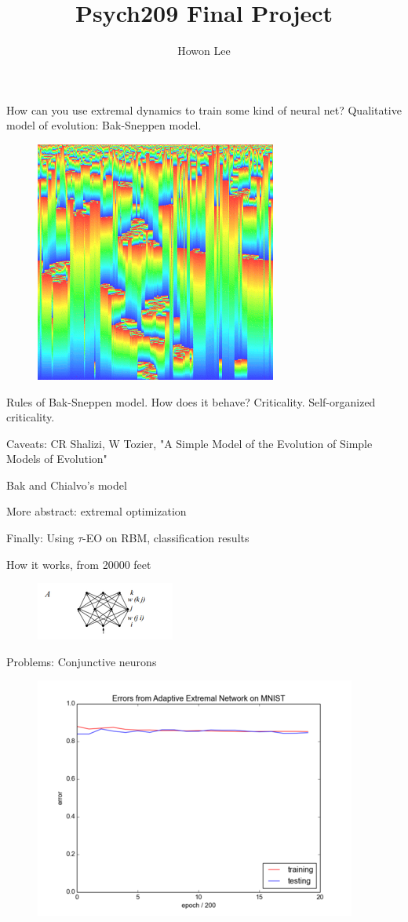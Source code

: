 \documentclass[12pt]{article}
\begin{document}
\title{Psych209 Final Project}
\author{Howon Lee}
\maketitle

  How can you use extremal dynamics to train some kind of neural net?
  Qualitative model of evolution: Bak-Sneppen model.
  \begin{figure}
    \includegraphics{bak_sneppen}
  \end{figure}

  Rules of Bak-Sneppen model. How does it behave? Criticality. Self-organized criticality.

  Caveats: CR Shalizi, W Tozier, "A Simple Model of the Evolution of Simple Models of Evolution"
  
  Bak and Chialvo's model

  More abstract: extremal optimization

  Finally: Using $\tau$-EO on RBM, classification results
  
  How it works, from 20000 feet
  \begin{figure}
    \includegraphics{bak_chialvo_net_topology}
  \end{figure}
  
  Problems: Conjunctive neurons
  \begin{figure}
    \includegraphics{bak_plot}
  \end{figure}
\end{document}
